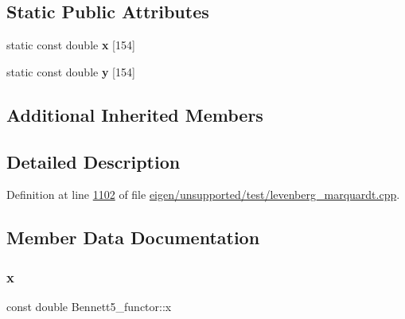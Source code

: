 \subsection*{Static Public Attributes}
\begin{DoxyCompactItemize}
\item 
static const double {\bfseries x} \mbox{[}154\mbox{]}
\item 
static const double {\bfseries y} \mbox{[}154\mbox{]}
\end{DoxyCompactItemize}
\subsection*{Additional Inherited Members}


\subsection{Detailed Description}


Definition at line \hyperlink{eigen_2unsupported_2test_2levenberg__marquardt_8cpp_source_l01102}{1102} of file \hyperlink{eigen_2unsupported_2test_2levenberg__marquardt_8cpp_source}{eigen/unsupported/test/levenberg\+\_\+marquardt.\+cpp}.



\subsection{Member Data Documentation}
\mbox{\label{struct_bennett5__functor_a1d1b1466d6783dd42a40aa5c31be6e86}} 
\subsubsection{\texorpdfstring{x}{x}}
{\footnotesize\ttfamily const double Bennett5\+\_\+functor\+::x\hspace{0.3cm}{\ttfamily [static]}}

